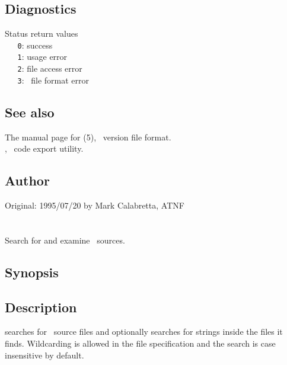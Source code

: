 \subsection*{Diagnostics}
 
Status return values
\\ \verb+   0+: success
\\ \verb+   1+: usage error
\\ \verb+   2+: file access error
\\ \verb+   3+: \rcs\ file format error
 
\subsection*{See also}
 
The manual page for (5), \rcs\ version file format.\\
, \aipspp\ code export utility.

 
\subsection*{Author}
 
Original: 1995/07/20 by Mark Calabretta, ATNF


\newpage
\section{}
\label{squiz}

Search for and examine \aipspp\ sources.

\subsection*{Synopsis}

\begin{synopsis}
\end{synopsis}

\subsection*{Description}

 searches for \aipspp\ source files and optionally searches for
strings inside the files it finds.  Wildcarding is allowed in the file
specification and the search is case insensitive by default.

